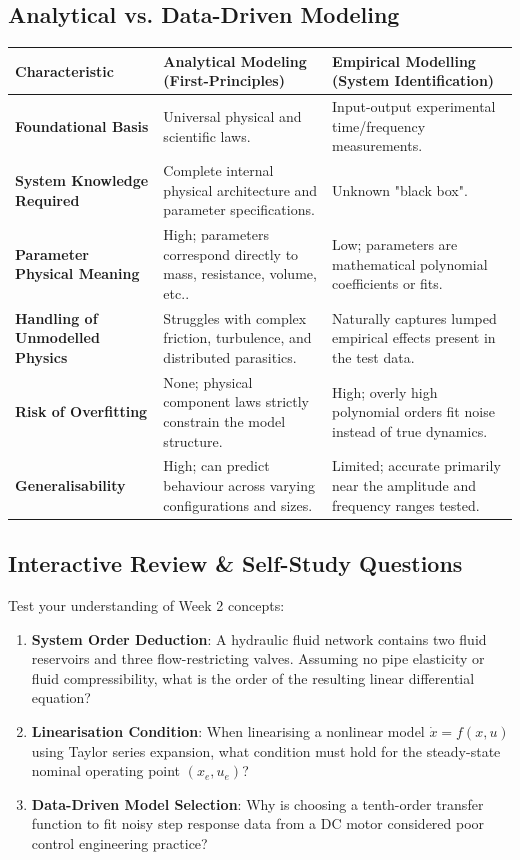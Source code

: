 \documentclass[12pt,onecolumn,twoside ]{article}
\begin{document}
	\subsection{Analytical vs. Data-Driven Modeling}
	\begin{center}\small\begin{tabularx}{\textwidth}{*{3}{Y}}
			\toprule
			\textbf{Characteristic} & \textbf{Analytical Modeling (First-Principles)} & \textbf{Empirical Modelling (System Identification)} \\
			\midrule
			\textbf{Foundational Basis} & Universal physical and scientific laws. & Input-output experimental time/frequency measurements. \\
			\textbf{System Knowledge Required} & Complete internal physical architecture and parameter specifications. & Unknown "black box". \\
			\textbf{Parameter Physical Meaning} & High; parameters correspond directly to mass, resistance, volume, etc.. & Low; parameters are mathematical polynomial coefficients or fits. \\
			\textbf{Handling of Unmodelled Physics} & Struggles with complex friction, turbulence, and distributed parasitics. & Naturally captures lumped empirical effects present in the test data. \\
			\textbf{Risk of Overfitting} & None; physical component laws strictly constrain the model structure. & High; overly high polynomial orders fit noise instead of true dynamics. \\
			\textbf{Generalisability} & High; can predict behaviour across varying configurations and sizes. & Limited; accurate primarily near the amplitude and frequency ranges tested. \\
			\bottomrule
	\end{tabularx}\end{center}
	
	\subsection{Interactive Review \& Self-Study Questions}
	Test your understanding of Week 2 concepts:
	\begin{enumerate}
		\item
		\textbf{System Order Deduction}: A hydraulic fluid network contains two fluid reservoirs and three flow-restricting valves. Assuming no pipe elasticity or fluid compressibility, what is the order of the resulting linear differential equation?
		\item
		\textbf{Linearisation Condition}: When linearising a nonlinear model $\dot{x} = f(x, u)$ using Taylor series expansion, what condition must hold for the steady-state nominal operating point $(x_e, u_e)$?
		\item
		\textbf{Data-Driven Model Selection}: Why is choosing a tenth-order transfer function to fit noisy step response data from a DC motor considered poor control engineering practice?
	\end{enumerate}
	
\end{document}
